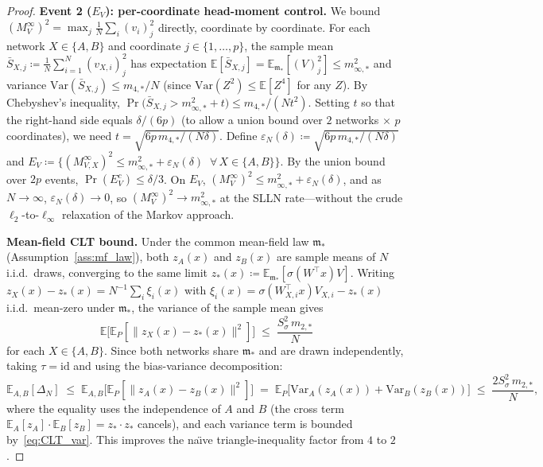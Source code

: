 \documentclass[11pt]{article}
\newcommand{\E}{\mathbb{E}}
\begin{document}
\begin{proof}
\textbf{Event 2 ($E_V$): per-coordinate head-moment control.}
We bound $(M_V^\infty)^2 = \max_j \frac{1}{N}\sum_i (v_i)_j^2$
directly, coordinate by coordinate.
For each network $X \in \{A,B\}$ and coordinate $j \in \{1,\ldots,p\}$,
the sample mean $\bar{S}_{X,j} \coloneqq \frac{1}{N}\sum_{i=1}^N (v_{X,i})_j^2$
has expectation $\E[\bar{S}_{X,j}] = \E_{\mathfrak{m}_*}[(V)_j^2]
\le m_{\infty,*}^2$ and variance
$\mathrm{Var}(\bar{S}_{X,j}) \le m_{4,*}/N$
(since $\mathrm{Var}(Z^2) \le \E[Z^4]$ for any $Z$).
By Chebyshev's inequality,
$\Pr\!\bigl(\bar{S}_{X,j} > m_{\infty,*}^2 + t\bigr)
\le m_{4,*}/(Nt^2)$.
Setting $t$ so that the right-hand side equals $\delta/(6p)$
(to allow a union bound over $2$ networks $\times$ $p$ coordinates),
we need $t = \sqrt{6p\,m_{4,*}/(N\delta)}$.
Define $\varepsilon_N(\delta) \coloneqq \sqrt{6p\,m_{4,*}/(N\delta)}$ and
$E_V \coloneqq \bigl\{(M_{V,X}^\infty)^2 \le m_{\infty,*}^2 + \varepsilon_N(\delta)
\;\;\forall\, X \in \{A,B\}\bigr\}$.
By the union bound over $2p$ events,
$\Pr(E_V^c) \le \delta/3$.
On $E_V$, $(M_V^\infty)^2 \le m_{\infty,*}^2 + \varepsilon_N(\delta)$,
and as $N \to \infty$, $\varepsilon_N(\delta) \to 0$, so
$(M_V^\infty)^2 \to m_{\infty,*}^2$ at the SLLN rate---without the
crude $\ell_2$-to-$\ell_\infty$ relaxation of the Markov approach.

\textbf{Mean-field CLT bound.}
Under the common mean-field law $\mathfrak{m}_*$
(Assumption~\ref{ass:mf_law}), both $z_A(x)$ and $z_B(x)$
are sample means of $N$ i.i.d.\ draws, converging to the same limit
$z_*(x) \coloneqq \E_{\mathfrak{m}_*}[\sigma(W^\top x)V]$.
Writing
$z_X(x) - z_*(x) = N^{-1}\sum_i \xi_i(x)$ with
$\xi_i(x) = \sigma(W_{X,i}^\top x)V_{X,i} - z_*(x)$ i.i.d.\ mean-zero
under $\mathfrak{m}_*$, the variance of the sample mean gives
\begin{equation}\label{eq:CLT_var}
  \E\!\bigl[\E_P[\|z_X(x)-z_*(x)\|^2]\bigr]
  \;\le\; \frac{S_\sigma^2\,m_{2,*}}{N}
\end{equation}
for each $X\in\{A,B\}$.
Since both networks share $\mathfrak{m}_*$ and are drawn independently,
taking $\tau = \mathrm{id}$ and using the bias-variance decomposition:
\begin{equation}\label{eq:Delta_CLT}
  \E_{A,B}[\Delta_N]
  \;\le\; \E_{A,B}\!\bigl[\E_P[\|z_A(x)-z_B(x)\|^2]\bigr]
  \;=\; \E_P\!\bigl[\mathrm{Var}_A(z_A(x)) + \mathrm{Var}_B(z_B(x))\bigr]
  \;\le\; \frac{2S_\sigma^2\,m_{2,*}}{N},
\end{equation}
where the equality uses the independence of $A$ and $B$
(the cross term $\E_A[z_A]\cdot\E_B[z_B] = z_*\cdot z_*$ cancels),
and each variance term is bounded by~\eqref{eq:CLT_var}.
This improves the na\"{\i}ve triangle-inequality factor from $4$ to $2$.


\end{proof}
\end{document}
